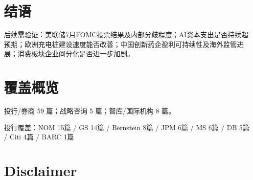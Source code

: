 \documentclass[11pt]{ctexart}
\begin{document}
\section{结语}
后续需验证：美联储7月FOMC投票结果及内部分歧程度；AI资本支出是否持续超预期；欧洲充电桩建设速度能否改善；中国创新药企盈利可持续性及海外监管进展；消费板块企业间分化是否进一步加剧。
\newpage
\section{覆盖概览}
投行/券商 59 篇；战略咨询 5 篇；智库/国际机构 8 篇。\par
投行覆盖：NOM 15篇 / GS 14篇 / Bernstein 8篇 / JPM 6篇 / MS 6篇 / DB 5篇 / Citi 4篇 / BARC 1篇\par
\section{Disclaimer}
\end{document}
